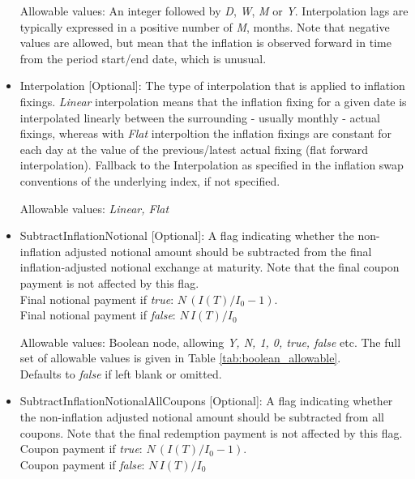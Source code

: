 \begin{itemize}
Allowable values: An integer followed by \emph{D}, \emph{W}, \emph{M} or \emph{Y}. Interpolation lags are typically expressed in a positive number of  \emph{M}, months. Note that negative values are allowed, but mean that the inflation is observed forward in time from the period start/end date, which is unusual.  

\item Interpolation [Optional]: The type of interpolation that is applied to inflation fixings. \emph{Linear} interpolation means that the inflation fixing for a given date is interpolated linearly between the surrounding - usually monthly - actual fixings, whereas with  \emph{Flat} interpoltion the inflation fixings are constant for each day at the value of the previous/latest actual fixing (flat forward interpolation).  
Fallback to the Interpolation as specified in the inflation swap conventions of the underlying index, if not specified. 

Allowable values:  \emph{Linear, Flat} 

\item SubtractInflationNotional [Optional]: A flag indicating whether
  the non-inflation adjusted notional amount should be subtracted from
  the final inflation-adjusted notional exchange at maturity.
  Note that the final coupon payment is not affected by this flag. \\ 
Final notional payment if \emph{true}: $N \,(I(T)/I_0-1)$. \\ 
Final notional payment if  \emph{false}: $N \,I(T)/I_0$ 

Allowable values: Boolean node, allowing \emph{Y, N, 1, 0, true, false} etc. The full set of allowable values is given in Table \ref{tab:boolean_allowable}.
\\Defaults to \emph{false}  if left blank or omitted.

\item SubtractInflationNotionalAllCoupons [Optional]: A flag indicating whether
  the non-inflation adjusted notional amount should be subtracted from
  all coupons.
  Note that the final redemption payment is not affected by this flag. \\ 
Coupon payment if \emph{true}: $N \,(I(T)/I_0-1)$. \\ 
Coupon payment if  \emph{false}: $N \,I(T)/I_0$ 


\end{itemize}
